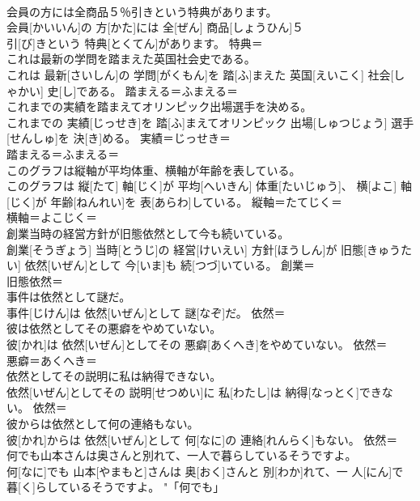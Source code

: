 \documentclass[8pt]{extreport}
\begin{document}
\begin{CJK}{UTF8}{min}
\\	会員の方には全商品５％引きという特典があります。	
\\	会員[かいいん]の 方[かた]には 全[ぜん] 商品[しょうひん]５ 
\\	[ぱーせんと] 引[び]きという 特典[とくてん]があります。	特典＝ 
\\	これは最新の学問を踏まえた英国社会史である。	
\\	これは 最新[さいしん]の 学問[がくもん]を 踏[ふ]まえた 英国[えいこく] 社会[しゃかい] 史[し]である。	踏まえる＝ふまえる＝ 
\\	これまでの実績を踏まえてオリンピック出場選手を決める。	
\\	これまでの 実績[じっせき]を 踏[ふ]まえてオリンピック 出場[しゅつじょう] 選手[せんしゅ]を 決[き]める。	実績＝じっせき＝ 
\\	踏まえる＝ふまえる＝ 
\\	このグラフは縦軸が平均体重、横軸が年齢を表している。	
\\	このグラフは 縦[たて] 軸[じく]が 平均[へいきん] 体重[たいじゅう]、 横[よこ] 軸[じく]が 年齢[ねんれい]を 表[あらわ]している。	縦軸＝たてじく＝ 
\\	横軸＝よこじく＝ 
\\	創業当時の経営方針が旧態依然として今も続いている。	
\\	創業[そうぎょう] 当時[とうじ]の 経営[けいえい] 方針[ほうしん]が 旧態[きゅうたい] 依然[いぜん]として 今[いま]も 続[つづ]いている。	創業＝ 
\\	旧態依然＝ 
\\	事件は依然として謎だ。	
\\	事件[じけん]は 依然[いぜん]として 謎[なぞ]だ。	依然＝ 
\\	彼は依然としてその悪癖をやめていない。	
\\	彼[かれ]は 依然[いぜん]としてその 悪癖[あくへき]をやめていない。	依然＝ 
\\	悪癖＝あくへき＝ 
\\	依然としてその説明に私は納得できない。	
\\	依然[いぜん]としてその 説明[せつめい]に 私[わたし]は 納得[なっとく]できない。	依然＝ 
\\	彼からは依然として何の連絡もない。	
\\	彼[かれ]からは 依然[いぜん]として 何[なに]の 連絡[れんらく]もない。	依然＝ 
\\	何でも山本さんは奥さんと別れて、一人で暮らしているそうですよ。	
\\	何[なに]でも 山本[やまもと]さんは 奥[おく]さんと 別[わか]れて、一 人[にん]で 暮[く]らしているそうですよ。	"「何でも」 

\end{CJK}
\end{document}
